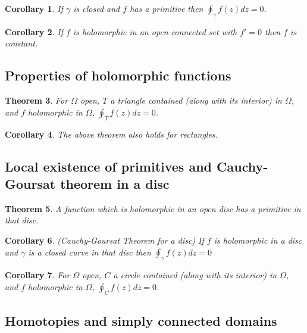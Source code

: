 \documentclass[12pt]{article}
\newtheorem{thm}{Theorem}[section]
\newtheorem{cor}[thm]{Corollary}
\theoremstyle{definition}
\begin{document}
\begin{cor}
  If $\gamma$ is closed and $f$ has a primitive then $\oint_{\gamma}f(z)dz = 0$.
\end{cor}

\begin{cor}
  If $f$ is holomorphic in an open connected set with $f' = 0$ then $f$ is constant.
\end{cor}

\subsection{Properties of holomorphic functions}

\begin{thm}
  For $\Omega$ open, $T$ a triangle contained (along with its interior) in $\Omega$, and $f$ holomorphic in $\Omega$, $\oint_Tf(z)dz = 0$.
\end{thm}

\begin{cor}
  The above theorem also holds for rectangles.
\end{cor}


\subsection{Local existence of primitives and Cauchy-Goursat theorem in a disc}

\begin{thm}
  A function which is holomorphic in an open disc has a primitive in that disc.
\end{thm}

\begin{cor}
  (Cauchy-Goursat Theorem for a disc)
  If $f$ is holomorphic in a disc and $\gamma$ is a closed curve in that disc then $\oint_{\gamma}f(z)dz = 0$
\end{cor}

\begin{cor}
  For $\Omega$ open, $C$ a circle contained (along with its interior) in $\Omega$, and $f$ holomorphic in $\Omega$, $\oint_Cf(z)dz = 0$.
\end{cor}

\subsection{Homotopies and simply connected domains}
\end{document}
